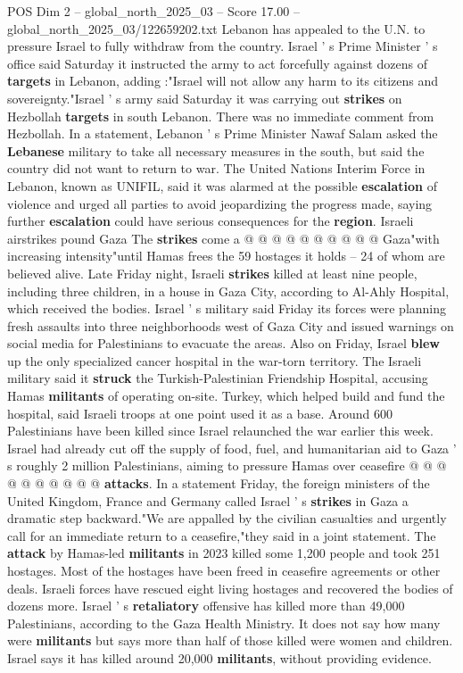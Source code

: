 \begin{textsample}{POS Dim 2 – global\_north\_2025\_03 – Score 17.00 – global\_north\_2025\_03/122659202.txt}
Lebanon has appealed to the U.N. to pressure Israel to fully withdraw from the country.
Israel ' s Prime Minister ' s office said Saturday it instructed the army to act forcefully against dozens of \textbf{targets} in Lebanon, adding :"Israel will not allow any harm to its citizens and sovereignty."Israel ' s army said Saturday it was carrying out \textbf{strikes} on Hezbollah \textbf{targets} in south Lebanon.
There was no immediate comment from Hezbollah.
In a statement, Lebanon ' s Prime Minister Nawaf Salam asked the \textbf{Lebanese} military to take all necessary measures in the south, but said the country did not want to return to war.
The United Nations Interim Force in Lebanon, known as UNIFIL, said it was alarmed at the possible \textbf{escalation} of violence and urged all parties to avoid jeopardizing the progress made, saying further \textbf{escalation} could have serious consequences for the \textbf{region}.
Israeli airstrikes pound Gaza The \textbf{strikes} come a @ @ @ @ @ @ @ @ @ @ Gaza"with increasing intensity"until Hamas frees the 59 hostages it holds -- 24 of whom are believed alive.
Late Friday night, Israeli \textbf{strikes} killed at least nine people, including three children, in a house in Gaza City, according to Al-Ahly Hospital, which received the bodies.
Israel ' s military said Friday its forces were planning fresh assaults into three neighborhoods west of Gaza City and issued warnings on social media for Palestinians to evacuate the areas.
Also on Friday, Israel \textbf{blew} up the only specialized cancer hospital in the war-torn territory.
The Israeli military said it \textbf{struck} the Turkish-Palestinian Friendship Hospital, accusing Hamas \textbf{militants} of operating on-site.
Turkey, which helped build and fund the hospital, said Israeli troops at one point used it as a base.
Around 600 Palestinians have been killed since Israel relaunched the war earlier this week.
Israel had already cut off the supply of food, fuel, and humanitarian aid to Gaza ' s roughly 2 million Palestinians, aiming to pressure Hamas over ceasefire @ @ @ @ @ @ @ @ @ @ \textbf{attacks}.
In a statement Friday, the foreign ministers of the United Kingdom, France and Germany called Israel ' s \textbf{strikes} in Gaza a dramatic step backward."We are appalled by the civilian casualties and urgently call for an immediate return to a ceasefire,"they said in a joint statement.
The \textbf{attack} by Hamas-led \textbf{militants} in 2023 killed some 1,200 people and took 251 hostages.
Most of the hostages have been freed in ceasefire agreements or other deals.
Israeli forces have rescued eight living hostages and recovered the bodies of dozens more.
Israel ' s \textbf{retaliatory} offensive has killed more than 49,000 Palestinians, according to the Gaza Health Ministry.
It does not say how many were \textbf{militants} but says more than half of those killed were women and children.
Israel says it has killed around 20,000 \textbf{militants}, without providing evidence.

\end{textsample}
